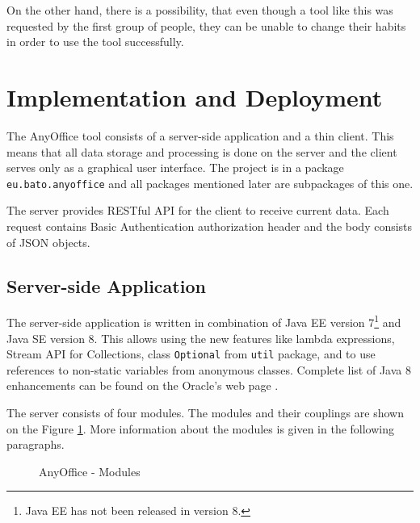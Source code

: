 \documentclass[11pt,singleside]{myfithesis2}
\newcommand{\pict}[4]{
	\begin{figure}[h!]
  		\vspace{-7px}
  		\centerline{\fcolorbox{darkgray}{palegray}{\texttt{[image: \#2]}}}
  		\caption{#1}
  		\label{#4}
	\end{figure}
}
\begin{document}
On the other hand, there is a possibility, that even though a tool like this was requested by the first group of people, they can be unable to change their habits in order to use the tool successfully.
	
	\section{Implementation and Deployment}
The AnyOffice tool consists of a server-side application and a thin client. This means that all data storage and processing is done on the server and the client serves only as a graphical user interface. The project is in a package \texttt{eu.bato.anyoffice} and all packages mentioned later are subpackages of this one.

The server provides RESTful API for the client to receive current data. Each request contains Basic Authentication authorization header and the body consists of JSON objects.


		\subsection{Server-side Application}
The server-side application is written in combination of Java EE version 7\footnote{Java EE has not been released in version 8.} and Java SE version 8. This allows using the new features like lambda expressions, Stream API for Collections, class \texttt{Optional} from \texttt{util} package, and to use references to non-static variables from anonymous classes. Complete list of Java 8 enhancements can be found on the Oracle's web page \cite{java8}.

The server consists of four modules. The modules and their couplings are shown on the Figure \ref{pic:anyofficeModules}. More information about the modules is given in the following paragraphs.

\pict{AnyOffice - Modules}{data/modules.png}{width=0.8\textwidth}{pic:anyofficeModules}
\end{document}
